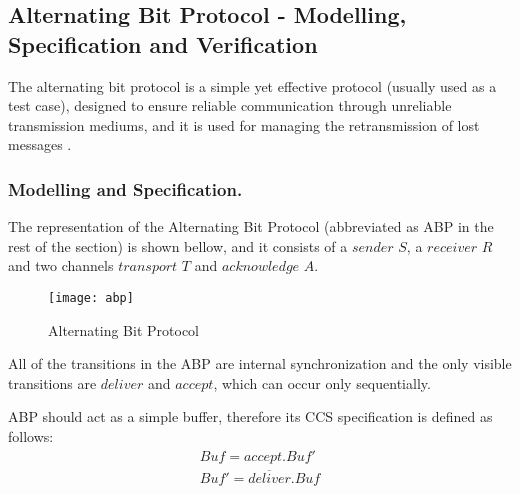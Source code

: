 \subsection{Alternating Bit Protocol - Modelling, Specification and Verification}

The alternating bit protocol is a simple yet effective protocol (usually used as a test case), designed to ensure reliable communication through unreliable transmission mediums, and it is used for managing the retransmission of lost messages \cite{ReactiveSystems3}\cite{Kulick}.

\subsubsection{Modelling and Specification.}
The representation of the Alternating Bit Protocol (abbreviated as ABP in the rest of the section) is shown bellow, and it consists of a $sender$ $S$, a $receiver$ $R$ and two channels $transport$ $T$ and $acknowledge$ $A$. 

\begin{figure}[h]
\centering
\texttt{[image: abp]}
\caption{Alternating Bit Protocol}
\label{fig:abp}
\end{figure}

All of the transitions in the ABP are internal synchronization and the only visible transitions are $deliver$ and $accept$, which can occur only sequentially. 

ABP should act as a simple buffer, therefore its CCS specification is defined as follows:
\begin{equation}\label{eq:abp_spec}
	\begin{array}{lcl}
		Buf = accept.Buf'\\
		Buf' = \overline{deliver}.Buf
	\end{array}
\end{equation}

